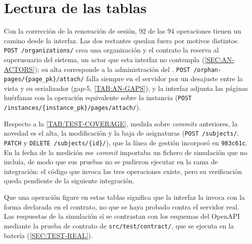 \section*{Lectura de las tablas}
Con la corrección de la renovación de sesión, 92 de las 94 operaciones tienen
un camino desde la interfaz. Las dos restantes quedan fuera por motivos
distintos. \texttt{POST /organizations/} crea una organización y el contrato la
reserva al superusuario del sistema, un actor que esta interfaz no contempla
(\cref{SEC:AN-ACTORS}); su alta corresponde a la administración del
. \texttt{POST /orphan-pages/\{page\_pk\}/attach/} falla siempre en
el servidor por un desajuste entre la vista y su serializador (gap-5,
\cref{TAB:AN-GAPS}), y la interfaz adjunta las páginas huérfanas con la
operación equivalente sobre la instancia
(\texttt{POST /instances/\{instance\_pk\}/pages/attach/}).

Respecto a la \cref{TAB:TEST-COVERAGE}, medida sobre \textit{commits}
anteriores, la novedad es el alta, la modificación y la baja de asignaturas
(\texttt{POST /subjects/}, \texttt{PATCH} y \texttt{DELETE /subjects/\{id\}/}),
que la línea de gestión incorporó en \texttt{983c61c}. En la fecha de la
medición ese \textit{commit} importaba un fichero de simulación que no incluía,
de modo que sus pruebas no se pudieron ejecutar en la rama de integración: el
código que invoca las tres operaciones existe, pero su verificación queda
pendiente de la siguiente integración.

Que una operación figure en estas tablas significa que la interfaz la invoca
con la forma declarada en el contrato, no que se haya probado contra el
servidor real. Las respuestas de la simulación sí se contrastan con los
esquemas del OpenAPI mediante la prueba de contrato de
\texttt{src/test/contract/}, que se ejecuta en la batería
(\cref{SEC:TEST-REAL}).
